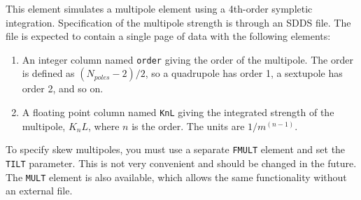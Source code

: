 \begin{raggedright}
This element simulates a multipole element using a 4th-order sympletic
integration.  
Specification of the multipole strength is through an SDDS file.
The file is expected to contain a single page of
data with the following elements:
\end{raggedright}
\begin{enumerate}
\item An integer column named {\tt order} giving the order of the multipole.
The order is defined as $(N_{poles}-2)/2$, so a quadrupole has order 1, a
sextupole has order 2, and so on.
\item A floating point column named {\tt KnL} giving the integrated strength of
the multipole, $K_n L$, where $n$ is the order.  The units are $1/m^(n-1)$.
\end{enumerate}
To specify skew multipoles, you must use a separate {\tt FMULT} element and
set the {\tt TILT} parameter.  This is not very convenient and should be
changed in the future.  The {\tt MULT} element is also available, which allows
the same functionality without an external file.
